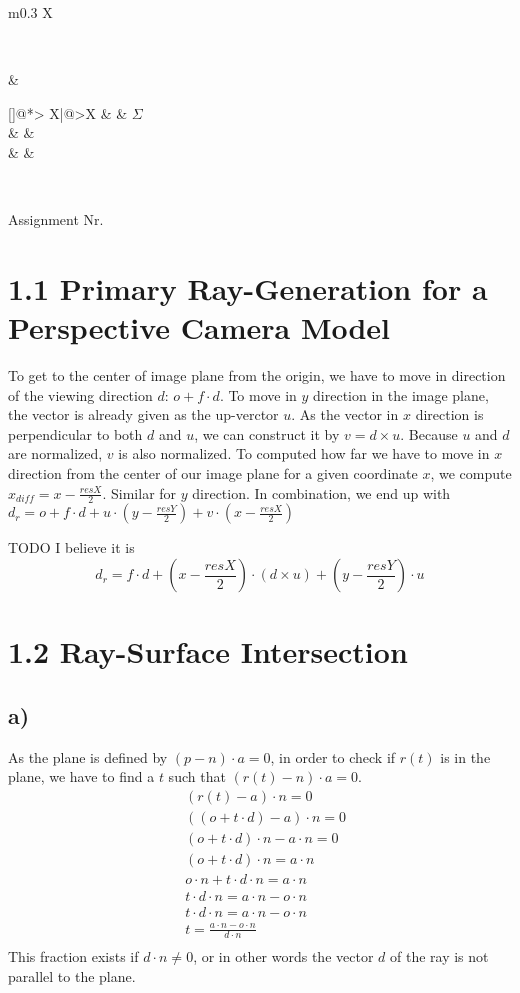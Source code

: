 \documentclass[a4paper]{scrartcl}
\makeatletter
\def\header#1#2{
  \begin{center}
    {\Large Assignment #1}\\
  \end{center}
}
\newcounter{punktelistectr}
\newcounter{punkte}
\newcommand{\punkteliste}[2]{%
  \setcounter{punkte}{#2}%
  \addtocounter{punkte}{-#1}%
  \stepcounter{punkte}%
  \begin{center}%
  \begin{tabularx}{\linewidth}[]{@{}*{\thepunkte}{>{\centering\arraybackslash} X|}@{}>{\centering\arraybackslash}X}
      \forloop{punktelistectr}{#1}{\value{punktelistectr} < #2 } %
      {%
        \thepunktelistectr &
      }
      #2 &  $\Sigma$ \\
      \hline
      \forloop{punktelistectr}{#1}{\value{punktelistectr} < #2 } %
      {%
        &
      } &\\
      \forloop{punktelistectr}{#1}{\value{punktelistectr} < #2 } %
      {%
        &
      } &\\
    \end{tabularx}
  \end{center}
}
\makeatother
\begin{document}
\begin{tabularx}{\linewidth}{m{0.3 \linewidth}X}
  \begin{minipage}{\linewidth}
    \STUDENTA\\
    \STUDENTB
  \end{minipage} & \begin{minipage}{\linewidth}
    \punkteliste{1}{\EXERCISES}
  \end{minipage}\\
\end{tabularx}
\header{Nr. \NUMBER}{\DEADLINE}


\section*{1.1 Primary Ray-Generation for a Perspective Camera Model}
To get to the center of image plane from the origin, we have to move in
direction of the viewing direction $d$: $o+f\cdot d$. To move in $y$ direction
in the image plane, the vector is already given as the up-verctor $u$. As the
vector in $x$ direction is perpendicular to both $d$ and $u$, we can construct
it by $v=d\times u$. Because $u$ and $d$ are normalized, $v$ is also normalized.
To computed how far we have to move in $x$ direction from the center of our
image plane for a given coordinate $x$, we compute $x_{diff}=x-\frac{resX}{2}$.
Similar for $y$ direction. In combination, we end up with $d_r = o + f \cdot d+
u \cdot (y-\frac{resY}{2}) + v \cdot (x-\frac{resX}{2})$

TODO I believe it is 
$$d_r = f \cdot d + (x - \frac{resX}{2}) \cdot (d \times u) + (y - \frac{resY}{2}) \cdot u$$

\section*{1.2 Ray-Surface Intersection}
    \subsection*{a)}
        As the plane is defined by $(p-n)\cdot a=0$, in order to check if $r(t)$
        is in the plane, we have to find a $t$ such that $(r(t)-n)\cdot a=0$.
        \begin{align*}
            &(r(t)-a)\cdot n=0\\
            &((o+t\cdot d)-a)\cdot n=0\\
            &(o+t\cdot d) \cdot n -a\cdot n=0\\
            &(o+t\cdot d) \cdot n =a\cdot n\\
            &o\cdot n+t\cdot d\cdot n =a\cdot n\\
            &t\cdot d\cdot n =a\cdot n-o\cdot n\\
            &t\cdot d\cdot n =a\cdot n-o\cdot n\\
            &t=\frac{a\cdot n-o\cdot n}{d\cdot n}\\
        \end{align*}
        This fraction exists if $d\cdot n \neq 0$, or in other words the vector
        $d$ of the ray is not parallel to the plane. 
\end{document}
